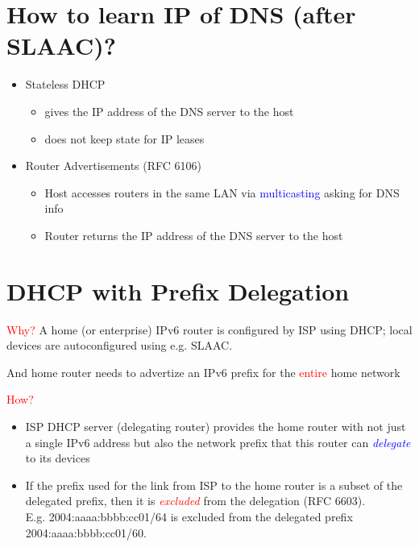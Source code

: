 \documentclass[11pt]{article}
\begin{document}
\section*{How to learn IP of DNS (after SLAAC)?}

\begin{itemize}
	\item Stateless DHCP
	\begin{itemize}
		\item gives the IP address of the DNS server to the host
	\item does not keep state for IP leases
\end{itemize}
	
\end{itemize}

\begin{itemize}
	\item Router Advertisements (RFC 6106)
	\begin{itemize}
		\item Host accesses routers in the same LAN via \textcolor{blue}{multicasting} asking for DNS info
	\item Router returns the IP address of the DNS server to the host
\end{itemize}
	
\end{itemize}

\section*{DHCP with Prefix Delegation}

\textcolor{red}{Why?} A home (or enterprise) IPv6 router is configured by ISP using DHCP; local devices are autoconfigured using e.g. SLAAC.

And home router needs to advertize an IPv6 prefix for the \textcolor{red}{entire} home network

\textcolor{red}{How?}
\begin{itemize}
	\item ISP DHCP server (delegating router) provides the home router with not just a single IPv6 address but also the network prefix that this router can \textcolor{blue}{\textit{delegate}} to its devices
	\item  If the prefix used for the link from ISP to the home router is a subset of the delegated prefix, then it is \textcolor{red}{\textit{excluded}} from the delegation (RFC 6603). \\
E.g. 2004:aaaa:bbbb:cc01/64 is excluded from the delegated prefix 2004:aaaa:bbbb:cc01/60.
\end{itemize}
\end{document}
